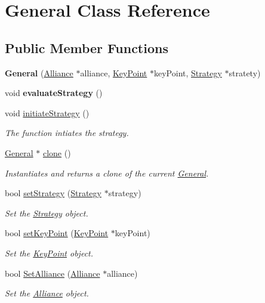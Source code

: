 \hypertarget{classGeneral}{}\section{General Class Reference}
\label{classGeneral}
\subsection*{Public Member Functions}
\begin{DoxyCompactItemize}
\item 
\mbox{\label{classGeneral_aac0e45729c88a46d6ea7ef5d54f4baa6}} 
{\bfseries General} (\hyperlink{classAlliance}{Alliance} $\ast$alliance, \hyperlink{classKeyPoint}{Key\+Point} $\ast$key\+Point, \hyperlink{classStrategy}{Strategy} $\ast$stratety)
\item 
\mbox{\label{classGeneral_af4bee805ca5f7756c6d1f1c3fcde862a}} 
void {\bfseries evaluate\+Strategy} ()
\item 
void \hyperlink{classGeneral_a449172bcf1b4bf8b9a47af6b4e435d7e}{initiate\+Strategy} ()
\begin{DoxyCompactList}\small\item\em The function intiates the strategy. \end{DoxyCompactList}\item 
\hyperlink{classGeneral}{General} $\ast$ \hyperlink{classGeneral_a6c73103d464cf8f3ed95deea76d788d5}{clone} ()
\begin{DoxyCompactList}\small\item\em Instantiates and returns a clone of the current \hyperlink{classGeneral}{General}. \end{DoxyCompactList}\item 
bool \hyperlink{classGeneral_abe8dcb93ddb9b79bd8e75e8c642758ba}{set\+Strategy} (\hyperlink{classStrategy}{Strategy} $\ast$strategy)
\begin{DoxyCompactList}\small\item\em Set the \hyperlink{classStrategy}{Strategy} object. \end{DoxyCompactList}\item 
bool \hyperlink{classGeneral_ae82ae73aef77ee8379aed00dcd5fe953}{set\+Key\+Point} (\hyperlink{classKeyPoint}{Key\+Point} $\ast$key\+Point)
\begin{DoxyCompactList}\small\item\em Set the \hyperlink{classKeyPoint}{Key\+Point} object. \end{DoxyCompactList}\item 
bool \hyperlink{classGeneral_a4256fe7650e6162ca6785c2132364057}{Set\+Alliance} (\hyperlink{classAlliance}{Alliance} $\ast$alliance)
\begin{DoxyCompactList}\small\item\em Set the \hyperlink{classAlliance}{Alliance} object. \end{DoxyCompactList}\end{DoxyCompactItemize}


